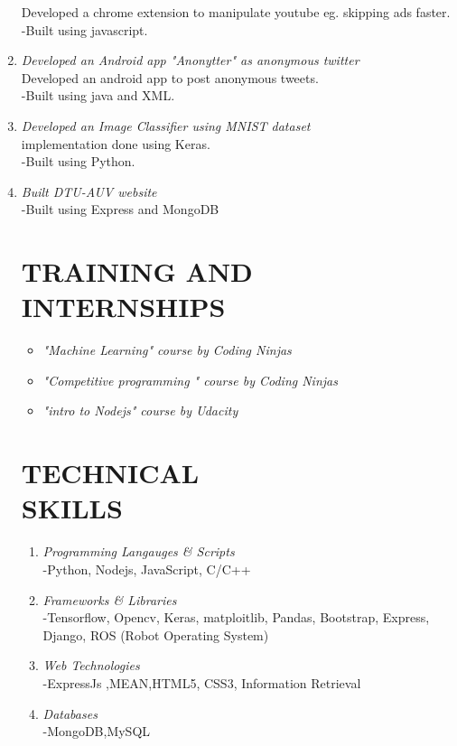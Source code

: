 \documentclass[margin]{res}
\begin{document}
\begin{enumerate}
 Developed a chrome extension to manipulate youtube eg. skipping ads faster.\\
  	-Built using javascript.\\
\item {\large{\sl Developed an Android app "Anonytter" as anonymous twitter}}\\
 Developed an android app to post anonymous tweets.\\
  	-Built using java and XML.\\
\item {\large{\sl Developed an Image Classifier using MNIST dataset}}\\
 implementation done using Keras.\\
  	-Built using Python.\\
\item {\large{\sl Built DTU-AUV website}}\\
 
  	-Built using Express and MongoDB\\

\section{TRAINING AND INTERNSHIPS} \begin{itemize}
 
 \item{\sl  "Machine Learning" course by Coding Ninjas }
 \item{\sl  "Competitive programming " course by Coding Ninjas}
 \item{\sl  "intro to Nodejs" course by Udacity}
 \end{itemize}

\section{TECHNICAL  \\ SKILLS} \begin{enumerate}
\item {\sl Programming Langauges \& Scripts }\\
	-Python, Nodejs, JavaScript, C/C++
\item {\sl Frameworks \& Libraries}\\
	-Tensorflow, Opencv, Keras, matploitlib, Pandas, Bootstrap, Express, Django, ROS (Robot Operating System)
\item {\sl Web Technologies}\\
	-ExpressJs ,MEAN,HTML5, CSS3, Information Retrieval 
\item{\sl Databases}\\
	-MongoDB,MySQL
\end{enumerate}




\end{enumerate}
\end{document}
